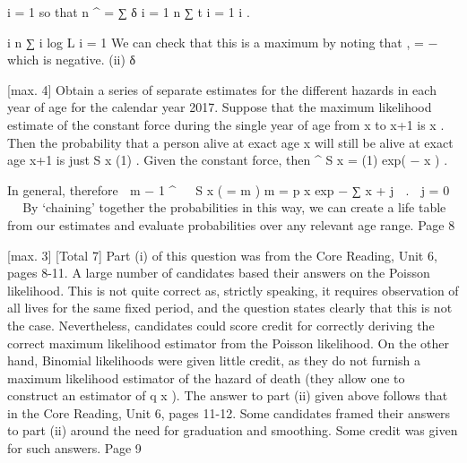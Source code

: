 \documentclass[a4paper,12pt]{article}
\begin{document}
i = 1
so that
n
^
\mu =
∑ δ
i = 1
n
∑ t
i = 1
i
.

i
n
∑
i
 log L
i = 1
We can check that this is a maximum by noting that
,
=
−
\partial {}
which is negative.
(ii)
δ


[max. 4]
Obtain a series of separate estimates for the different hazards
in each year of age for the calendar year 2017. 
Suppose that the maximum likelihood estimate of the constant force
during the single year of age from x to x+1 is \mu x . 
Then the probability that a person alive at exact age x will still be alive at
exact age x+1 is just S x (1) . Given the constant force, then
^
S x =
(1) exp( − \mu x ) .

In general, therefore
 m − 1 ^ 

S x ( =
m ) m =
p x exp − ∑ \mu x + j  .
 j = 0



By ‘chaining’ together the probabilities in this way, we can create
a life table from our estimates and evaluate probabilities over
any relevant age range.
Page 8


[max. 3]
[Total 7]
Part (i) of this question was from the Core Reading, Unit 6, pages
8-11. A large number of candidates based their answers on the
Poisson likelihood. This is not quite correct as, strictly speaking, it
requires observation of all lives for the same fixed period, and the
question states clearly that this is not the case. Nevertheless,
candidates could score credit for correctly deriving the correct
maximum likelihood estimator from the Poisson likelihood. On the
other hand, Binomial likelihoods were given little credit, as they do
not furnish a maximum likelihood estimator of the hazard of death
(they allow one to construct an estimator of q x ). The answer to
part (ii) given above follows that in the Core Reading, Unit 6,
pages 11-12. Some candidates framed their answers to part (ii)
around the need for graduation and smoothing. Some credit was
given for such answers.
Page 9
\end{document}
